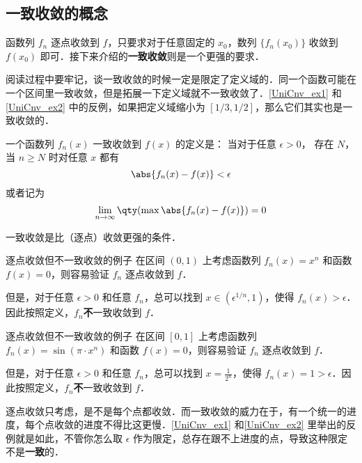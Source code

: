 



\subsection{一致收敛的概念}

函数列 $f_n$ 逐点收敛到 $f$，只要求对于任意固定的 $x_0$，数列 $\{f_n(x_0)\}$ 收敛到 $f(x_0)$ 即可．接下来介绍的\textbf{一致收敛}则是一个更强的要求．

阅读过程中要牢记，谈一致收敛的时候一定是限定了定义域的．同一个函数可能在一个区间里一致收敛，但是拓展一下定义域就不一致收敛了．\autoref{UniCnv_ex1} 和\autoref{UniCnv_ex2} 中的反例，如果把定义域缩小为 $[1/3, 1/2]$，那么它们其实也是一致收敛的．

一个函数列 $f_n(x)$ 一致收敛到 $f(x)$ 的定义是： 当对于任意 $\epsilon > 0$， 存在 $N$， 当 $n \geqslant N$ 时对任意 $x$ 都有
\begin{equation}\label{UniCnv_eq1}
\abs{f_n(x) - f(x)} < \epsilon
\end{equation}
或者记为
\begin{equation}
\lim_{n\to\infty} \qty(\max \abs{f_n(x) - f(x)}) = 0
\end{equation}

一致收敛是比（逐点）收敛更强的条件．

\begin{example}{逐点收敛但不一致收敛的例子}\label{UniCnv_ex1}
在区间 $(0, 1)$ 上考虑函数列 $f_n(x)=x^n$ 和函数 $f(x)=0$，则容易验证 $f_n$ 逐点收敛到 $f$．

但是，对于任意 $\epsilon>0$ 和任意 $f_n$，总可以找到 $x\in(\epsilon^{1/n}, 1)$，使得 $f_n(x)>\epsilon$．因此按照定义，$f_n$\textbf{不}一致收敛到 $f$．

\end{example}

\begin{example}{逐点收敛但不一致收敛的例子}\label{UniCnv_ex2}
在区间 $[0, 1]$ 上考虑函数列 $f_n(x)=\sin(\pi\cdot x^n)$ 和函数 $f(x)=0$，则容易验证 $f_n$ 逐点收敛到 $f$．

但是，对于任意 $\epsilon>0$ 和任意 $f_n$，总可以找到 $x=\frac{1}{2^n}$，使得 $f_n(x)=1>\epsilon$．因此按照定义，$f_n$\textbf{不}一致收敛到 $f$．

\end{example}

逐点收敛只考虑，是不是每个点都收敛．而一致收敛的威力在于，有一个统一的进度，每个点收敛的进度不得比这更慢．\autoref{UniCnv_ex1} 和\autoref{UniCnv_ex2} 里举出的反例就是如此，不管你怎么取 $\epsilon$ 作为限定，总存在跟不上进度的点，导致这种限定不是\textbf{一致}的．

